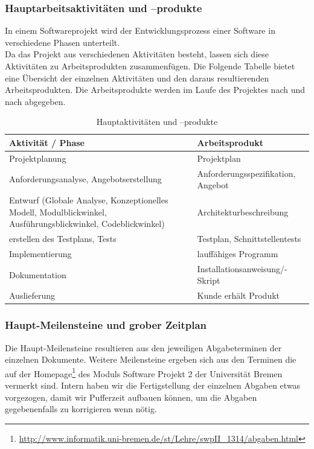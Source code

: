 \documentclass[fontsize=12pt,paper=a4,twoside]{scrartcl}
\begin{document}
\subsubsection{Hauptarbeitsaktivitäten und --produkte}

In einem Softwareprojekt wird der Entwicklungsprozess einer Software in verschiedene Phasen unterteilt.\\
Da das Projekt aus verschiedenen Aktivitäten besteht, lassen sich diese Aktivitäten zu Arbeitsprodukten zusammenfügen. Die Folgende Tabelle bietet eine Übersicht der einzelnen Aktivitäten und den daraus resultierenden Arbeitsprodukten. Die Arbeitsprodukte werden im Laufe des Projektes nach und nach abgegeben.\\

\begin{table}[htbp]
\caption{Hauptaktivitäten und --produkte}
\centering
\begin{tabular}{p{7cm}|p{7cm}}
\hline Aktivität / Phase & Arbeitsprodukt \\ \hline
\hline Projektplanung & Projektplan\\
\hline Anforderungsanalyse, Angebotserstellung & Anforderungsspezifikation, Angebot\\
\hline Entwurf (Globale Analyse, Konzeptionelles Modell, Modulblickwinkel, Ausführungsblickwinkel, Codeblickwinkel) & Architekturbeschreibung\\
\hline erstellen des Testplans, Tests & Testplan, Schnittstellentests\\
\hline Implementierung & lauffähiges Programm\\
\hline Dokumentation & Installationsanweisung/-Skript\\
\hline Auslieferung & Kunde erhält Produkt\\
\hline 
\end{tabular}
\end{table}

\newpage

\subsubsection{Haupt-Meilensteine und grober Zeitplan}\label{meilensteine}

Die Haupt-Meilensteine resultieren aus den jeweiligen Abgabeterminen der einzelnen Dokumente. Weitere Meilensteine ergeben sich aus den Terminen die auf der Homepage\footnote{\url{http://www.informatik.uni-bremen.de/st/Lehre/swpII_1314/abgaben.html}} des Moduls Software Projekt 2 der Universität Bremen vermerkt sind. Intern haben wir die Fertigstellung der einzelnen Abgaben etwas vorgezogen, damit wir Pufferzeit aufbauen können, um die Abgaben gegebenenfalls zu korrigieren wenn nötig.
\end{document}
